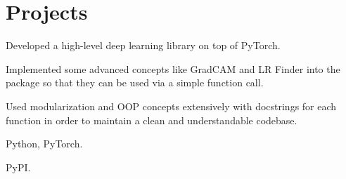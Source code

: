 
\section{Projects}

\begin{tightemize}
\item Developed a high-level deep learning library on top of PyTorch.
\item Implemented some advanced concepts like GradCAM and LR Finder into the package so that they can be used via a simple function call.
\item Used modularization and OOP concepts extensively with docstrings for each function in order to maintain a clean and understandable codebase.
\item {} Python, PyTorch.
\item {} PyPI.
\end{tightemize}
\sectionsep